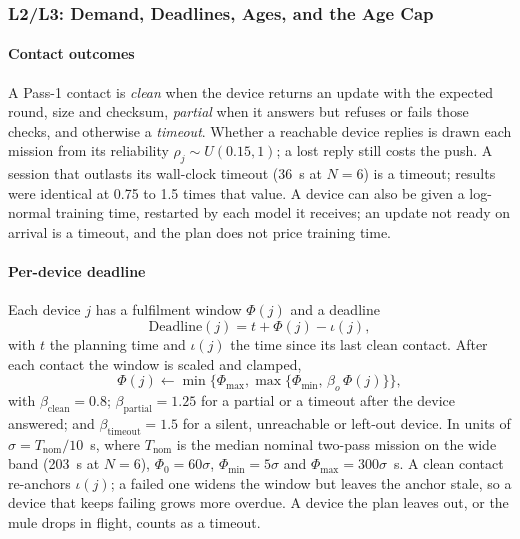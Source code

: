 \documentclass[conference]{IEEEtran}
\newcommand{\Tnom}{T_{\mathrm{nom}}}
\begin{document}
\subsubsection{L2/L3: Demand, Deadlines, Ages, and the Age Cap}
\label{sec:method:demand}

\paragraph{Contact outcomes}
A Pass-1 contact is \emph{clean} when the device returns an update with the
expected round, size and checksum, \emph{partial} when it answers but refuses
or fails those checks, and otherwise a \emph{timeout}. Whether a reachable device
replies is drawn each mission from its reliability $\rho_j\sim U(0.15,1)$; a lost
reply still costs the push. A session that outlasts its wall-clock timeout (36~s
at $N=6$) is a timeout; results were identical at 0.75 to 1.5 times that value.
A device can also be given a log-normal training time, restarted by each model
it receives; an update not ready on arrival is a timeout, and the plan does not
price training time.

\paragraph{Per-device deadline}
Each device $j$ has a fulfilment window $\Phi(j)$ and a deadline
\begin{equation}
\mathrm{Deadline}(j)=t+\Phi(j)-\iota(j),
\label{eq:deadline}
\end{equation}
with $t$ the planning time and $\iota(j)$ the time since its last clean contact.
After each contact the window is scaled and clamped,
\begin{equation}
\Phi(j)\leftarrow\min\{\Phi_{\max},\max\{\Phi_{\min},\,\beta_{o}\,\Phi(j)\}\},
\label{eq:phi}
\end{equation}
with $\beta_{\mathrm{clean}}=0.8$; $\beta_{\mathrm{partial}}=1.25$ for a partial
or a timeout after the device answered; and $\beta_{\mathrm{timeout}}=1.5$ for a
silent, unreachable or left-out device. In units of $\sigma=\Tnom/10$~s, where
$\Tnom$ is the median nominal two-pass mission on the wide band (203~s at $N=6$),
$\Phi_0=60\sigma$, $\Phi_{\min}=5\sigma$ and $\Phi_{\max}=300\sigma$~s. A clean
contact re-anchors $\iota(j)$; a failed one widens the window but leaves the
anchor stale, so a device that keeps failing grows more overdue. A device the
plan leaves out, or the mule drops in flight, counts as a timeout.
\end{document}
